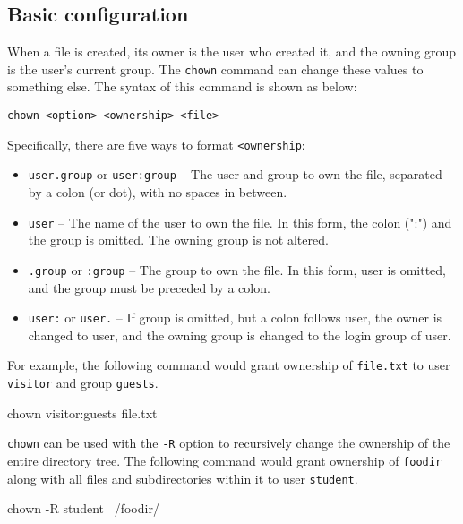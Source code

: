 \subsection{Basic configuration}

When a file is created, its owner is the user who created it, and the owning group is the user's current group. The \verb|chown| command can change these values to something else. The syntax of this command is shown as below:

\begin{verbatim}
chown <option> <ownership> <file>
\end{verbatim}

Specifically, there are five ways to format \verb|<ownership|:

\begin{itemize}
\item \verb|user.group| or \verb|user:group| -- The user and group to own the file, separated by a colon (or dot), with no spaces in between.
\item \verb|user| -- The name of the user to own the file. In this form, the colon (":") and the group is omitted. The owning group is not altered.
\item \verb|.group| or \verb|:group| -- The group to own the file. In this form, user is omitted, and the group must be preceded by a colon.
\item \verb|user:| or \verb|user.| -- If group is omitted, but a colon follows user, the owner is changed to user, and the owning group is changed to the login group of user.
\end{itemize}

For example, the following command would grant ownership of \verb|file.txt| to user \verb|visitor| and group \verb|guests|.

\begin{commandshell}
chown visitor:guests file.txt
\end{commandshell}

\verb|chown| can be used with the \verb|-R| option to recursively change the ownership of the entire directory tree. The following command would grant ownership of \verb|foodir| along with all files and subdirectories within it to user \verb|student|.

\begin{commandshell}
chown -R student ~/foodir/
\end{commandshell}

